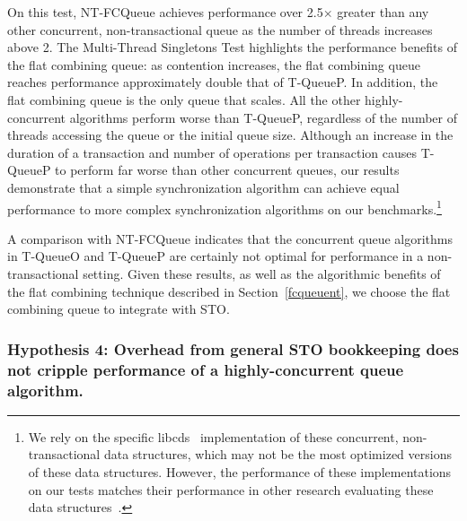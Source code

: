 On this test, NT-FCQueue achieves performance over 2.5$\times$ greater than any other concurrent, non-transactional queue as the number of threads increases above 2. The Multi-Thread Singletons Test highlights the performance benefits of the flat combining queue: as contention increases, the flat combining queue reaches performance approximately double that of T-QueueP. In addition, the flat combining queue is the only queue that scales. All the other highly-concurrent algorithms perform worse than T-QueueP, regardless of the number of threads accessing the queue or the initial queue size. 
Although an increase in the duration of a transaction and number of operations per transaction causes T-QueueP to perform far worse than other concurrent queues, our results demonstrate that a simple synchronization algorithm can achieve equal performance to more complex synchronization algorithms on our benchmarks.\footnote{We rely on the specific libcds~\cite{libcds} implementation of these concurrent, non-transactional data structures, which may not be the most optimized versions of these data structures. However, the performance of these implementations on our tests matches their performance in other research evaluating these data structures~\cite{queue1, queue3}.}

A comparison with NT-FCQueue indicates that the concurrent queue algorithms in T-QueueO and T-QueueP are certainly not optimal for performance in a non-transactional setting.
Given these results, as well as the algorithmic benefits of the flat combining technique described in Section~\ref{fcqueuent}, we choose the flat combining queue to integrate with STO.

\vspace{12pt}
\noindent{}

\subsubsection{Hypothesis 4: Overhead from general STO bookkeeping does not cripple performance of a highly-concurrent queue algorithm.}

